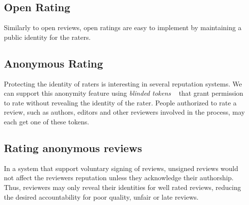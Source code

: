 


\subsection*{Open Rating}

Similarly to open reviews, open ratings are easy to implement by maintaining a
public identity for the raters.

\subsection{Anonymous Rating}

Protecting the identity of raters is interesting in several reputation systems.
We can support this anonymity feature using \emph{blinded tokens}
~\cite{schaub2016trustless} that grant permission to rate without revealing the
identity of the rater. People authorized to rate a review, such as authors,
editors and other reviewers involved in the process, may each get one of these
tokens.

\subsection*{Rating anonymous reviews}

In a system that support voluntary signing of reviews, unsigned reviews would
not affect the reviewers reputation unless they acknowledge their authorship.
Thus, reviewers may only reveal their identities for well rated reviews,
reducing the desired accountability for poor quality, unfair or late reviews.

